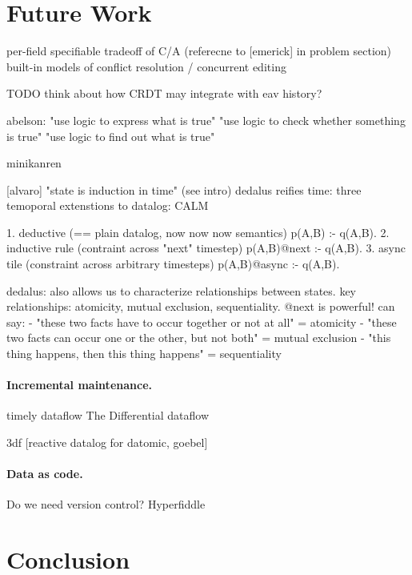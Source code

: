 \cleardoublepage
\section{Future Work}

per-field specifiable tradeoff of C/A (referecne to [emerick] in problem section)
built-in models of conflict resolution / concurrent editing

TODO think about how \gls{CRDT} may integrate with eav history?

abelson: "use logic to express what is true" "use logic to check whether something is true" "use logic to find out what is true" \cite{sicp}

minikanren \cite{byrd2010relational}




[alvaro] "state is induction in time" (see intro) dedalus \cite{alvaro2010dedalus} reifies time: three temoporal extenstions to datalog:
\gls{CALM} \cite{alvaro2011consistency}

1. deductive (== plain datalog, now now now semantics) p(A,B) :- q(A,B).
2. inductive rule (contraint across "next" timestep) p(A,B)@next :- q(A,B).
3. async tile (constraint across arbitrary timesteps) p(A,B)@async :- q(A,B).

dedalus: also allows us to characterize relationships between states.
key relationships: atomicity, mutual exclusion, sequentiality.
@next is powerful! can say:
- "these two facts have to occur together or not at all" = atomicity
- "these two facts can occur one or the other, but not both" = mutual exclusion
- "this thing happens, then this thing happens" = sequentiality

\paragraph{Incremental maintenance.}

\cite{green2013datalog}
timely dataflow \cite{murray2013naiad}
The Differential dataflow \cite{mcsherry2013differential}

3df [reactive datalog for datomic, goebel] \cite{gobel2019optimising}


\paragraph{Data as code.}
Do we need version control?
Hyperfiddle \cite{getz18hyperfiddle}


\cleardoublepage
\section{Conclusion}
